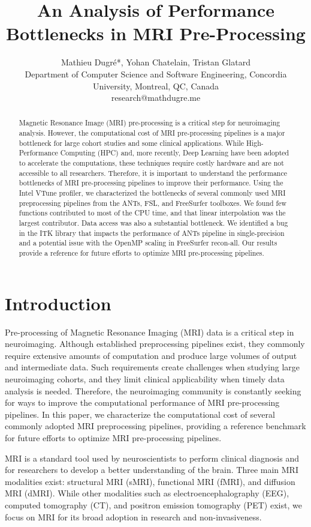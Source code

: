 \documentclass[conference]{IEEEtran}
\title{An Analysis of Performance Bottlenecks in MRI Pre-Processing}
\author{Mathieu Dugr\'e*, Yohan Chatelain, Tristan Glatard
\\Department of Computer Science and Software Engineering, Concordia University, Montreal, QC, Canada
\\research@mathdugre.me}
\begin{document}
\maketitle

\begin{abstract}
	Magnetic Resonance Image (MRI) pre-processing is a critical step for neuroimaging analysis. However, the computational cost of MRI pre-processing pipelines is a major bottleneck for large cohort studies and some clinical applications. While High-Performance Computing (HPC) and, more recently, Deep Learning have been adopted to accelerate the computations, these techniques require costly hardware and are not accessible to all researchers. Therefore, it is important to understand the performance bottlenecks of MRI pre-processing pipelines to improve their performance. Using the Intel VTune profiler, we characterized the bottlenecks of several commonly used MRI preprocessing pipelines from the ANTs, FSL, and FreeSurfer toolboxes. We found few functions contributed to most of the CPU time, and that linear interpolation was the largest contributor. Data access was also a substantial bottleneck. We identified a bug in the ITK library that impacts the performance of ANTs pipeline in single-precision and a potential issue with the OpenMP scaling in FreeSurfer recon-all. Our results provide a reference for future efforts to optimize MRI pre-processing pipelines.
\end{abstract}

\section{Introduction}
Pre-processing of Magnetic Resonance Imaging (MRI) data is a critical step in neuroimaging. Although established preprocessing pipelines exist, they commonly require extensive amounts of computation and produce large volumes of output and intermediate data. Such requirements create challenges when studying large neuroimaging cohorts, and they limit clinical applicability when timely data analysis is needed. Therefore, the neuroimaging community is constantly seeking for ways to improve the computational performance of MRI pre-processing pipelines. In this paper, we characterize the computational cost of several commonly adopted MRI preprocessing pipelines, providing a reference benchmark for future efforts to optimize MRI pre-processing pipelines.

MRI is a standard tool used by neuroscientists to perform clinical diagnosis and for researchers to develop a better understanding of the brain. Three main MRI modalities exist: structural MRI (sMRI), functional MRI (fMRI), and diffusion MRI (dMRI). While other modalities such as electroencephalography (EEG), computed tomography (CT), and positron emission tomography (PET) exist, we focus on MRI for its broad adoption in research and non-invasiveness.
\end{document}
